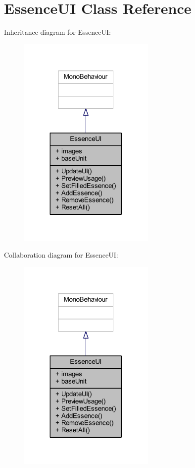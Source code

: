 \hypertarget{class_essence_u_i}{}\section{Essence\+UI Class Reference}
\label{class_essence_u_i}


Inheritance diagram for Essence\+UI\+:\nopagebreak
\begin{figure}[H]
\begin{center}
\leavevmode
\includegraphics[width=188pt]{class_essence_u_i__inherit__graph}
\end{center}
\end{figure}


Collaboration diagram for Essence\+UI\+:\nopagebreak
\begin{figure}[H]
\begin{center}
\leavevmode
\includegraphics[width=188pt]{class_essence_u_i__coll__graph}
\end{center}
\end{figure}
